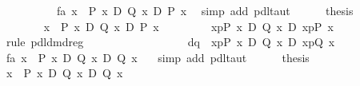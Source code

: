 \begin{isabellebody}
\ \ \isamarkupfalse%
\ {\isacharminus}\isanewline
\ \ \ \ \isamarkupfalse%
\ fa{\isacharcolon}\ {\isachardoublequote}{\isasymforall}x{\isachardot}\ {\isasymturnstile}\ P\ x\ {\isasymand}\isactrlsub D\ Q\ x\ {\isasymlongrightarrow}\isactrlsub D\ P\ x{\isachardoublequote}\ \isamarkupfalse%
\ {\isacharparenleft}simp\ add{\isacharcolon}\ pdl{\isacharunderscore}taut{\isacharparenright}\isanewline
\ \ \ \ \isamarkupfalse%
\ {\isacharquery}thesis\isanewline
\ \ \ \ \isamarkupfalse%
\ {\isacharminus}\ \isanewline
\ \ \ \ \ \ \isamarkupfalse%
\ {\isachardoublequote}{\isasymforall}x{\isachardot}\ {\isasymturnstile}\ P\ x\ {\isasymand}\isactrlsub D\ Q\ x\ {\isasymlongrightarrow}\isactrlsub D\ P\ x{\isachardoublequote}\isanewline
\ \ \ \ \ \ \isamarkupfalse%
\ {\isachardoublequote}{\isasymturnstile}\ {\isasymlangle}x{\isasymleftarrow}p{\isasymrangle}{\isacharparenleft}P\ x\ {\isasymand}\isactrlsub D\ Q\ x{\isacharparenright}\ {\isasymlongrightarrow}\isactrlsub D\ {\isasymlangle}x{\isasymleftarrow}p{\isasymrangle}{\isacharparenleft}P\ x{\isacharparenright}{\isachardoublequote}\ \isamarkupfalse%
\ {\isacharparenleft}rule\ pdl{\isacharunderscore}dmd{\isacharunderscore}reg{\isacharparenright}\isanewline
\ \ \ \ \isamarkupfalse%
\isanewline
\ \ \isamarkupfalse%
\isanewline
\ \ %
\isanewline
\ \ \isamarkupfalse%
\ \isanewline
\ \ \isamarkupfalse%
\ dq{\isacharcolon}\ {\isachardoublequote}{\isasymturnstile}\ {\isasymlangle}x{\isasymleftarrow}p{\isasymrangle}{\isacharparenleft}P\ x\ {\isasymand}\isactrlsub D\ Q\ x{\isacharparenright}\ {\isasymlongrightarrow}\isactrlsub D\ {\isasymlangle}x{\isasymleftarrow}p{\isasymrangle}{\isacharparenleft}Q\ x{\isacharparenright}{\isachardoublequote}\isanewline
\ \ \isamarkupfalse%
\ {\isacharminus}\isanewline
\ \ \ \ \isamarkupfalse%
\ fa{\isacharcolon}\ {\isachardoublequote}{\isasymforall}x{\isachardot}\ {\isasymturnstile}\ P\ x\ {\isasymand}\isactrlsub D\ Q\ x\ {\isasymlongrightarrow}\isactrlsub D\ Q\ x{\isachardoublequote}\ \ \isamarkupfalse%
\ {\isacharparenleft}simp\ add{\isacharcolon}\ pdl{\isacharunderscore}taut{\isacharparenright}\isanewline
\ \ \ \ \isamarkupfalse%
\ {\isacharquery}thesis\isanewline
\ \ \ \ \isamarkupfalse%
\ {\isacharminus}\ \isanewline
\ \ \ \ \ \ \isamarkupfalse%
\ {\isachardoublequote}{\isasymforall}x{\isachardot}\ {\isasymturnstile}\ P\ x\ {\isasymand}\isactrlsub D\ Q\ x\ {\isasymlongrightarrow}\isactrlsub D\ Q\ x{\isachardoublequote}\isanewline

\end{isabellebody}
